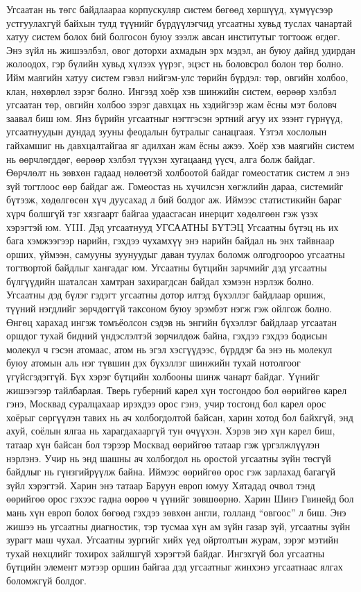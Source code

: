 Угсаатан нь төгс байдлаараа корпускуляр систем бөгөөд хөршүүд, хүмүүсээр устгуулахгүй байхын тулд түүнийг бүрдүүлэгчид угсаатны хувьд туслах чанартай хатуу систем болох бий болгосон буюу зээлж авсан институтыг тогтоож өгдөг. Энэ зүйл нь жишээлбэл, овог доторхи ахмадын эрх мэдэл, ан буюу дайнд удирдан жолоодох, гэр бүлийн хувьд хүлээх үүрэг, эцэст нь боловсрол болон төр болно. Ийм маягийн хатуу систем гэвэл нийгэм-улс төрийн бүрдэл: төр, овгийн холбоо, клан, нөхөрлөл зэрэг болно. Ингээд хоёр хэв шинжийн систем, өөрөөр хэлбэл угсаатан төр, овгийн холбоо зэрэг давхцах нь хэдийгээр жам ёсны мэт боловч заавал биш юм. Янз бүрийн угсаатныг нэгтгэсэн эртний агуу их эзэнт гүрнүүд, угсаатнуудын дундад зууны феодалын бутралыг санацгаая. Үзтэл хослолын гайхамшиг нь давхцалтайгаа яг адилхан жам ёсны ажээ. Хоёр хэв маягийн систем нь өөрчлөгддөг, өөрөөр хэлбэл түүхэн хугацаанд үүсч, алга болж байдаг. Өөрчлөлт нь зөвхөн гадаад нөлөөтэй холбоотой байдаг гомеостатик систем л энэ зүй тогтлоос өөр байдаг аж. Гомеостаз нь хүчилсэн хөгжлийн дараа, системийг бүтээж, хөдөлгөсөн хүч дуусахад л бий болдог аж. Иймээс статистикийн бараг хүрч болшгүй тэг хязгаарт байгаа удаасгасан инерцит хөдөлгөөн гэж үзэх хэрэгтэй юм.
YIII. Дэд угсаатнууд
УГСААТНЫ БҮТЭЦ
Угсаатны бүтэц нь их бага хэмжээгээр нарийн, гэхдээ чухамхүү энэ нарийн байдал нь энх тайвнаар орших, үймээн, самууны зуунуудыг даван туулах боломж олгодгоороо угсаатны тогтвортой байдлыг хангадаг юм. Угсаатны бүтцийн зарчмийг дэд угсаатны бүлгүүдийн шаталсан хамтран захирагдсан байдал хэмээн нэрлэж болно. Угсаатны дэд бүлэг гэдэгт угсаатны дотор илтэд бүхэллэг байдлаар оршиж, түүний нэгдлийг зөрчдөггүй таксоном буюу эрэмбэт нэгж гэж ойлгож болно. Өнгөц харахад ингэж томъёолсон сэдэв нь энгийн бүхэллэг байдлаар угсаатан оршдог тухай бидний үндэслэлтэй зөрчилдөж байна, гэхдээ гэхдээ бодисын молекул ч гэсэн атомаас, атом нь эгэл хэсгүүдээс, бүрддэг ба энэ нь молекул буюу атомын аль нэг түвшин дэх бүхэллэг шинжийн тухай нотолгоог үгүйсгэдэггүй. Бүх хэрэг бүтцийн холбооны шинж чанарт байдаг. Үүнийг жишээгээр тайлбарлая.
Тверь губерний карел хүн тосгондоо бол өөрийгөө карел гэнэ, Москвад суралцахаар ирэхдээ орос гэнэ, учир тосгонд бол карел орос хоёрыг сөргүүлэн тавих нь ач холбогдолтой байсан, харин хотод бол байхгүй, энд ахуй, соёлын ялгаа нь харагдахааргүй тун өчүүхэн. Хэрэв энэ хүн карел биш, татаар хүн байсан бол тэрээр Москвад өөрийгөө татаар гэж үргэлжлүүлэн нэрлэнэ. Учир нь энд шашны ач холбогдол нь оростой угсаатны зүйн төсгүй байдлыг нь гүнзгийрүүлж байна. Иймээс өөрийгөө орос гэж зарлахад багагүй зүйл хэрэгтэй. Харин энэ татаар Баруун европ юмуу Хятадад очвол тэнд өөрийгөө орос гэхээс гадна өөрөө ч үүнийг зөвшөөрнө. Харин Шинэ Гвинейд бол мань хүн европ болох бөгөөд гэхдээ зөвхөн англи, голланд “овгоос” л биш. Энэ жишээ нь угсаатны диагностик, тэр тусмаа хүн ам зүйн газар зүй, угсаатны зүйн зурагт маш чухал. Угсаатны зургийг хийх үед ойртолтын журам, зэрэг мэтийн тухай нөхцлийг тохирох зайлшгүй хэрэгтэй байдаг. Ингэхгүй бол угсаатны бүтцийн элемент мэтээр оршин байгаа дэд угсаатныг жинхэнэ угсаатнаас ялгах боломжгүй болдог.
